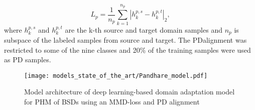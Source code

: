 \begin{equation}
    L_{p} = \frac{1}{n_{p}}\sum_{k=1}^{n_{p}}|h_{k}^{p,s}-h_{k}^{p,t}|_{2}, 
\end{equation}
where $h_{k}^{p,s}$ and $h_{k}^{p,t}$ are the k-th source and target domain samples and $n_{p}$ is subspace of the labeled samples from source and target. The PDalignment was restricted to some of the nine classes and 20\% of the training samples were used as PD samples.
\begin{figure}[H]
  \centering
  \texttt{[image: models\_state\_of\_the\_art/Pandhare\_model.pdf]}
  \caption{Model architecture of deep learning-based domain adaptation model for PHM of BSDs using an MMD-loss and PD alignment \cite{Pandhare2021}}
  \label{fig:Pandhare_model}
\end{figure}

